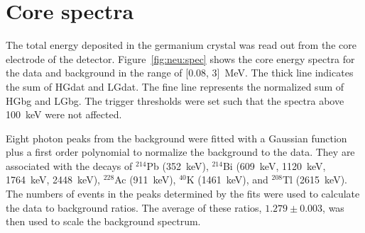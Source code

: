 \section{Core spectra}
\label{sec:neu:spec}
The total energy deposited in the germanium crystal was read out from the core electrode of the detector. Figure~\ref{fig:neu:spec} shows the core energy spectra for the data and background in the range of [0.08, 3]~MeV. The thick line indicates the sum of HGdat and LGdat. The fine line represents the normalized sum of HGbg and LGbg. The trigger thresholds were set such that the spectra above 100~keV were not affected.

Eight photon peaks from the background were fitted with a Gaussian
function plus a first order polynomial to normalize the background to
the data.  They are associated with the decays of $^{214}$Pb
(352~keV), $^{214}$Bi (609~keV, 1120~keV, 1764~keV, 2448~keV),
$^{228}$Ac (911~keV), $^{40}$K (1461~keV), and $^{208}$Tl (2615~keV).
The numbers of events in the peaks determined by the fits were used to
calculate the data to background ratios. The average of these ratios,
$1.279 \pm 0.003$, was then used to scale the background spectrum.

